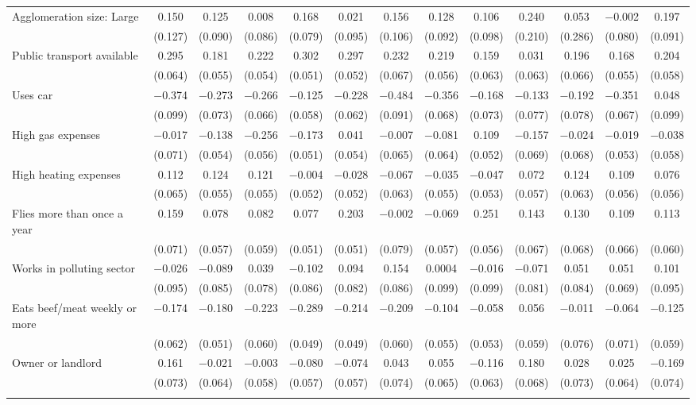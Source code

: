 \begin{tabular}{@{\extracolsep{5pt}}lcccccccccccc}
  Agglomeration size: Large & 0.150 & 0.125 & 0.008 & 0.168 & 0.021 & 0.156 & 0.128 & 0.106 & 0.240 & 0.053 & $-$0.002 & 0.197 \\ 
  & (0.127) & (0.090) & (0.086) & (0.079) & (0.095) & (0.106) & (0.092) & (0.098) & (0.210) & (0.286) & (0.080) & (0.091) \\ 
  Public transport available & 0.295 & 0.181 & 0.222 & 0.302 & 0.297 & 0.232 & 0.219 & 0.159 & 0.031 & 0.196 & 0.168 & 0.204 \\ 
  & (0.064) & (0.055) & (0.054) & (0.051) & (0.052) & (0.067) & (0.056) & (0.063) & (0.063) & (0.066) & (0.055) & (0.058) \\ 
  Uses car & $-$0.374 & $-$0.273 & $-$0.266 & $-$0.125 & $-$0.228 & $-$0.484 & $-$0.356 & $-$0.168 & $-$0.133 & $-$0.192 & $-$0.351 & 0.048 \\ 
  & (0.099) & (0.073) & (0.066) & (0.058) & (0.062) & (0.091) & (0.068) & (0.073) & (0.077) & (0.078) & (0.067) & (0.099) \\ 
  High gas expenses & $-$0.017 & $-$0.138 & $-$0.256 & $-$0.173 & 0.041 & $-$0.007 & $-$0.081 & 0.109 & $-$0.157 & $-$0.024 & $-$0.019 & $-$0.038 \\ 
  & (0.071) & (0.054) & (0.056) & (0.051) & (0.054) & (0.065) & (0.064) & (0.052) & (0.069) & (0.068) & (0.053) & (0.058) \\ 
  High heating expenses & 0.112 & 0.124 & 0.121 & $-$0.004 & $-$0.028 & $-$0.067 & $-$0.035 & $-$0.047 & 0.072 & 0.124 & 0.109 & 0.076 \\ 
  & (0.065) & (0.055) & (0.055) & (0.052) & (0.052) & (0.063) & (0.055) & (0.053) & (0.057) & (0.063) & (0.056) & (0.056) \\ 
  Flies more than once a year & 0.159 & 0.078 & 0.082 & 0.077 & 0.203 & $-$0.002 & $-$0.069 & 0.251 & 0.143 & 0.130 & 0.109 & 0.113 \\ 
  & (0.071) & (0.057) & (0.059) & (0.051) & (0.051) & (0.079) & (0.057) & (0.056) & (0.067) & (0.068) & (0.066) & (0.060) \\ 
  Works in polluting sector & $-$0.026 & $-$0.089 & 0.039 & $-$0.102 & 0.094 & 0.154 & 0.0004 & $-$0.016 & $-$0.071 & 0.051 & 0.051 & 0.101 \\ 
  & (0.095) & (0.085) & (0.078) & (0.086) & (0.082) & (0.086) & (0.099) & (0.099) & (0.081) & (0.084) & (0.069) & (0.095) \\ 
  Eats beef/meat weekly or more & $-$0.174 & $-$0.180 & $-$0.223 & $-$0.289 & $-$0.214 & $-$0.209 & $-$0.104 & $-$0.058 & 0.056 & $-$0.011 & $-$0.064 & $-$0.125 \\ 
  & (0.062) & (0.051) & (0.060) & (0.049) & (0.049) & (0.060) & (0.055) & (0.053) & (0.059) & (0.076) & (0.071) & (0.059) \\ 
  Owner or landlord & 0.161 & $-$0.021 & $-$0.003 & $-$0.080 & $-$0.074 & 0.043 & 0.055 & $-$0.116 & 0.180 & 0.028 & 0.025 & $-$0.169 \\ 
  & (0.073) & (0.064) & (0.058) & (0.057) & (0.057) & (0.074) & (0.065) & (0.063) & (0.068) & (0.073) & (0.064) & (0.074) \\ 
 \hline \\[-1.8ex] 


\end{tabular}
